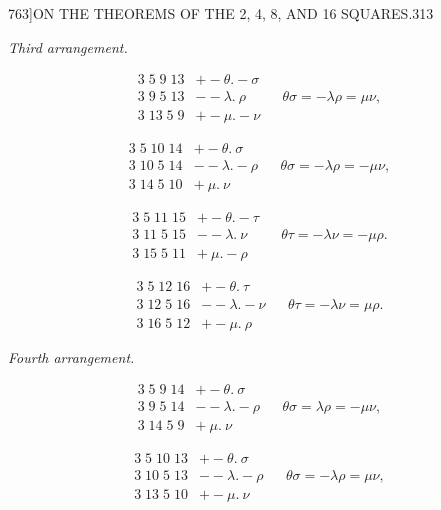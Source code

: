 \documentclass[11pt]{article}
\begin{document}
\begin{center}
{\small 763]\hfill ON THE THEOREMS OF THE 2, 4, 8, AND 16 SQUARES.\hfill 313}
\end{center}

\textit{Third arrangement.}

\begin{align*}
3\;5\;9\;13 & + -\theta.-\sigma & & \\
3\;9\;5\;13 & - -\lambda.\ \rho & & \theta\sigma = -\lambda\rho = \mu\nu, \\
3\;13\;5\;9 & + -\mu.-\nu
\end{align*}

\begin{align*}
3\;5\;10\;14 & + -\theta.\ \sigma & & \\
3\;10\;5\;14 & - -\lambda.-\rho & & \theta\sigma = -\lambda\rho = -\mu\nu, \\
3\;14\;5\;10 & + \ \mu.\ \nu
\end{align*}

\begin{align*}
3\;5\;11\;15 & + -\theta.-\tau & & \\
3\;11\;5\;15 & - -\lambda.\ \nu & & \theta\tau = -\lambda\nu = -\mu\rho. \\
3\;15\;5\;11 & + \ \mu.-\rho
\end{align*}

\begin{align*}
3\;5\;12\;16 & + -\theta.\ \tau & & \\
3\;12\;5\;16 & - -\lambda.-\nu & & \theta\tau = -\lambda\nu = \mu\rho. \\
3\;16\;5\;12 & + -\mu.\ \rho
\end{align*}

\textit{Fourth arrangement.}

\begin{align*}
3\;5\;9\;14 & + -\theta.\ \sigma & & \\
3\;9\;5\;14 & - -\lambda.-\rho & & \theta\sigma = \lambda\rho = -\mu\nu, \\
3\;14\;5\;9 & + \ \mu.\ \nu
\end{align*}

\begin{align*}
3\;5\;10\;13 & + -\theta.\ \sigma & & \\
3\;10\;5\;13 & - -\lambda.-\rho & & \theta\sigma = -\lambda\rho = \mu\nu, \\
3\;13\;5\;10 & + -\mu.\ \nu
\end{align*}
\end{document}
